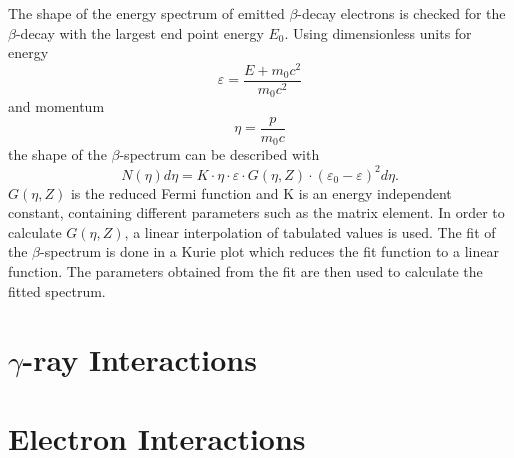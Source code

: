 \documentclass[pdftex, a4paper, 12pt,pointlessnumbers]{scrartcl} %
\begin{document}
The shape of the energy spectrum of emitted $\beta$-decay electrons is checked for the $\beta$-decay with the largest end point energy $E_0$. Using dimensionless units for energy
\begin{equation}
  \varepsilon = \frac{E + m_0c^2}{m_0c^2}
\end{equation}
and momentum
\begin{equation}
  \eta = \frac{p}{m_0c}
\end{equation}
the shape of the $\beta$-spectrum can be described with
\begin{equation}
  N(\eta) d\eta = K \cdot \eta \cdot \varepsilon \cdot G(\eta,Z) \cdot (\varepsilon_0 - \varepsilon)^2 d\eta.
\end{equation}
$G(\eta,Z)$ is the reduced Fermi function and K is an energy independent constant, containing different parameters such as the matrix element. In order to calculate $G(\eta,Z)$, a linear interpolation of tabulated values \cite{sie65} is used. The fit of the $\beta$-spectrum is done in a Kurie plot which reduces the fit function to a linear function. The parameters obtained from the fit are then used to calculate the fitted spectrum.





















\section{$\gamma$-ray Interactions}







\section{Electron Interactions}
\end{document}
